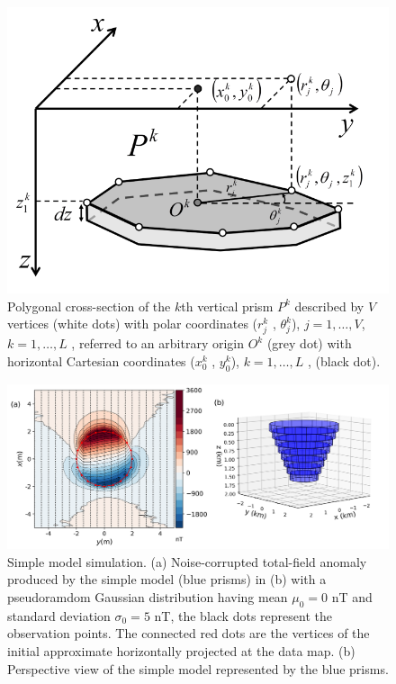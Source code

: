 \begin{figure}
    \centering
    \includegraphics[scale=0.3]{figures/prism_parameters_mod.png}
    \caption{Polygonal cross-section of the $k$th vertical prism $P^k$ described by $V$ vertices (white dots) with polar coordinates ($r^k_j$ , $\theta ^k_j$), $j = 1, \dots, V$, $k = 1, \dots, L$ , referred to an arbitrary origin $O^k$ (grey dot) with horizontal Cartesian coordinates ($x_0^k$ , $y_0^k$), $k = 1, \dots, L$ , (black dot).}
    \label{fig:prism_parameters}
\end{figure}


\begin{figure}
    \centering
    \includegraphics[scale=.5]{figures/simple_model_data.png}
    \caption{Simple model simulation. (a) Noise-corrupted total-field anomaly produced by the simple model (blue prisms) in (b) with a pseudoramdom Gaussian distribution having mean $\mu_0 = 0$ nT and standard deviation $\sigma_0 = 5$ nT, the black dots represent the observation points. The connected red dots are the vertices of the initial approximate horizontally projected at the data map. (b) Perspective view of the simple model represented by the blue prisms.
}
    \label{fig:simple_model}
\end{figure}

